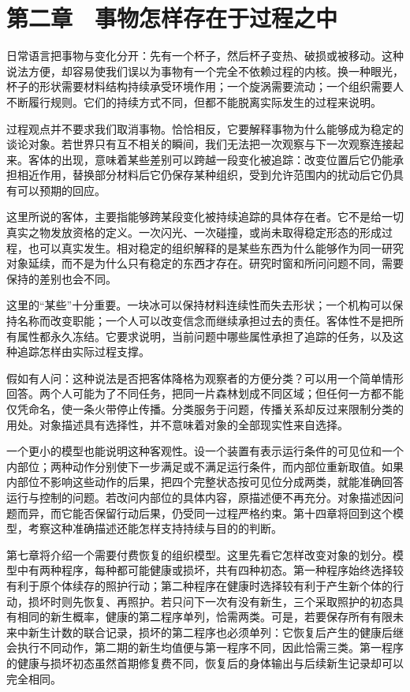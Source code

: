 \documentclass[
  11pt,
  oneside]{book}
\begin{document}
\par\endgroup

\chapter{第二章　事物怎样存在于过程之中}\label{ph-ch-02}

日常语言把事物与变化分开：先有一个杯子，然后杯子变热、破损或被移动。这种说法方便，却容易使我们误以为事物有一个完全不依赖过程的内核。换一种眼光，杯子的形状需要材料结构持续承受环境作用；一个旋涡需要流动；一个组织需要人不断履行规则。它们的持续方式不同，但都不能脱离实际发生的过程来说明。

过程观点并不要求我们取消事物。恰恰相反，它要解释事物为什么能够成为稳定的谈论对象。若世界只有互不相关的瞬间，我们无法把一次观察与下一次观察连接起来。客体的出现，意味着某些差别可以跨越一段变化被追踪：改变位置后它仍能承担相近作用，替换部分材料后它仍保存某种组织，受到允许范围内的扰动后它仍具有可以预期的回应。

这里所说的客体，主要指能够跨某段变化被持续追踪的具体存在者。它不是给一切真实之物发放资格的定义。一次闪光、一次碰撞，或尚未取得稳定形态的形成过程，也可以真实发生。相对稳定的组织解释的是某些东西为什么能够作为同一研究对象延续，而不是为什么只有稳定的东西才存在。研究时窗和所问问题不同，需要保持的差别也会不同。

这里的``某些''十分重要。一块冰可以保持材料连续性而失去形状；一个机构可以保持名称而改变职能；一个人可以改变信念而继续承担过去的责任。客体性不是把所有属性都永久冻结。它要求说明，当前问题中哪些属性承担了追踪的任务，以及这种追踪怎样由实际过程支撑。

假如有人问：这种说法是否把客体降格为观察者的方便分类？可以用一个简单情形回答。两个人可能为了不同任务，把同一片森林划成不同区域；但任何一方都不能仅凭命名，使一条火带停止传播。分类服务于问题，传播关系却反过来限制分类的用处。对象描述具有选择性，并不意味着对象的全部现实性来自选择。

一个更小的模型也能说明这种客观性。设一个装置有表示运行条件的可见位和一个内部位；两种动作分别使下一步满足或不满足运行条件，而内部位重新取值。如果内部位不影响这些动作的后果，把四个完整状态按可见位分成两类，就能准确回答运行与控制的问题。若改问内部位的具体内容，原描述便不再充分。对象描述因问题而异，而它能否保留行动后果，仍受同一过程严格约束。第十四章将回到这个模型，考察这种准确描述还能怎样支持持续与目的的判断。

第七章将介绍一个需要付费恢复的组织模型。这里先看它怎样改变对象的划分。模型中有两种程序，每种都可能健康或损坏，共有四种初态。第一种程序始终选择较有利于原个体续存的照护行动；第二种程序在健康时选择较有利于产生新个体的行动，损坏时则先恢复、再照护。若只问下一次有没有新生，三个采取照护的初态具有相同的新生概率，健康的第二程序单列，恰需两类。可是，若要保存所有有限未来中新生计数的联合记录，损坏的第二程序也必须单列：它恢复后产生的健康后继会执行不同动作，第二期的新生均值便与第一程序不同，因此恰需三类。第一程序的健康与损坏初态虽然首期修复费不同，恢复后的身体输出与后续新生记录却可以完全相同。
\end{document}
